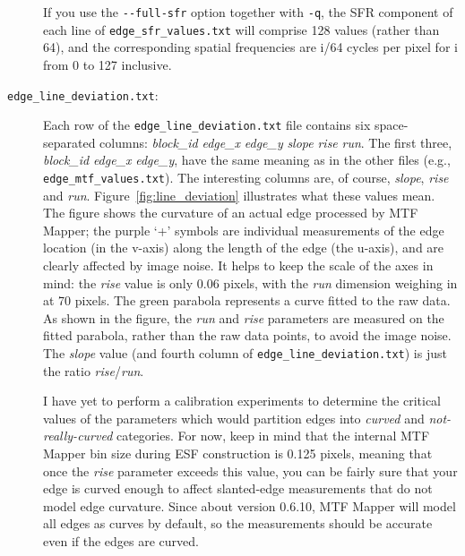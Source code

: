 \documentclass[a4paper]{article}
\begin{document}
\begin{description}
If you use the \verb+--full-sfr+ option together with \verb+-q+, the SFR component of
each line of \texttt{edge\_sfr\_values.txt} will comprise 128 values (rather than 64), 
and the corresponding spatial frequencies are i/64 cycles per pixel for i from 0 to 127 inclusive.

\item[\texttt{edge\_line\_deviation.txt}:]
Each row of the \texttt{edge\_line\_deviation.txt} file contains six space-separated columns:
\emph{block\_id} \emph{edge\_x} \emph{edge\_y} \emph{slope} \emph{rise}
\emph{run}. The first three, \emph{block\_id} \emph{edge\_x} \emph{edge\_y},
have the same meaning as in the other files (e.g.,
\texttt{edge\_mtf\_values.txt}). The interesting columns are, of course,
\emph{slope}, \emph{rise} and \emph{run}. Figure~\ref{fig:line_deviation}
illustrates what these values mean. The figure shows the curvature of an
actual edge processed by MTF Mapper; the purple `+' symbols are individual
measurements of the edge location (in the v-axis) along the length of the
edge (the u-axis), and are clearly affected by image noise.
It helps to keep the scale of the axes in mind: the \emph{rise} value is
only 0.06 pixels, with the \emph{run} dimension weighing in at 70 pixels. 
The green parabola represents a curve fitted to the raw
data. As shown in the figure, the \emph{run} and \emph{rise} parameters are
measured on the fitted parabola, rather than the raw data points, to avoid
the image noise. The \emph{slope} value (and fourth column of
\texttt{edge\_line\_deviation.txt}) is just the ratio
\emph{rise}/\emph{run}.

I have yet to perform a calibration experiments to determine the critical
values of the parameters which would partition edges into \emph{curved} and
\emph{not-really-curved} categories. For now, keep in mind that the internal
MTF Mapper bin size during ESF construction is 0.125 pixels, meaning that
once the \emph{rise} parameter exceeds this value, you can be fairly sure
that your edge is curved enough to affect slanted-edge measurements that do
not model edge curvature. Since about version 0.6.10, MTF Mapper will model
all edges as curves by default, so the measurements should be accurate even
if the edges are curved.

\end{description}
\end{document}
